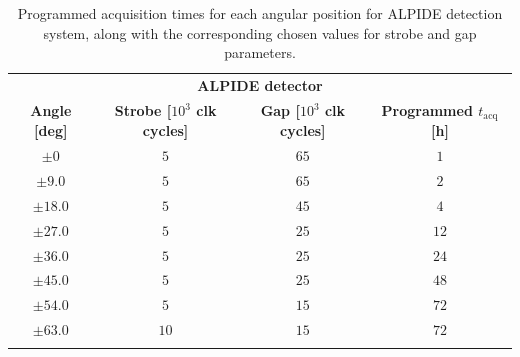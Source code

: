 \documentclass[../../main/main.tex]{subfiles}
\begin{document}



\begin{table}[h]
    \begin{tabular}{cccc}
        \toprule
        \multicolumn{4}{c}{\small \bf ALPIDE detector}  \\
        \colrule
        \textbf{Angle [deg]}    &
        \textbf{\boldmath Strobe [$10^3$ clk cycles]}   &
        \textbf{\boldmath Gap [$10^3$ clk cycles]}  &
        \textbf{\boldmath Programmed \( t_{\mathrm{acq}} \) [h]}    \\
        \colrule
        \( \pm  0   \)   &   \(  5 \)  &   \( 65 \)    &    \(  1 \)   \\
        \( \pm  9.0 \)   &   \(  5 \)  &   \( 65 \)    &    \(  2 \)   \\
        \( \pm 18.0 \)   &   \(  5 \)  &   \( 45 \)    &    \(  4 \)   \\
        \( \pm 27.0 \)   &   \(  5 \)  &   \( 25 \)    &    \( 12 \)   \\
        \( \pm 36.0 \)   &   \(  5 \)  &   \( 25 \)    &    \( 24 \)   \\
        \( \pm 45.0 \)   &   \(  5 \)  &   \( 25 \)    &    \( 48 \)   \\
        \( \pm 54.0 \)   &   \(  5 \)  &   \( 15 \)    &    \( 72 \)   \\
        \( \pm 63.0 \)   &   \( 10 \)  &   \( 15 \)    &    \( 72 \)   \\
        \botrule
    \end{tabular}
    \caption{Programmed acquisition times for each angular position for ALPIDE detection system, along with the corresponding chosen values for strobe and gap parameters.}
    \label{tab:tempiALPIDE}
\end{table}




\end{document}
